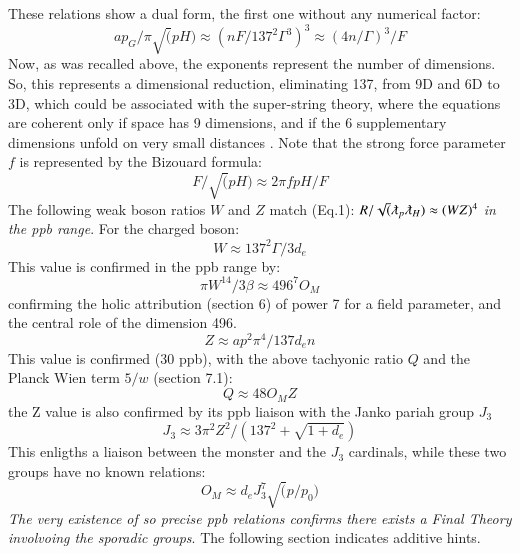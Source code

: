 \documentclass[twoside,draft]{article}
\begin{document}
\begin{sloppypar}
These relations show a dual form, the first one without any numerical factor:
\begin{equation}
ap_{G} / \pi \sqrt(pH) \approx (n F/137^{2} \Gamma^{3} )^{3} \approx (4n/ \Gamma)^{3}/F
\end{equation}
Now, as was recalled above, the exponents represent the number of
dimensions. So, this represents a dimensional reduction, eliminating 137, from 9D and 6D to
3D, which could be associated with the super-string theory, where the equations are coherent only if space
has 9 dimensions, and if the 6 supplementary dimensions unfold on very small distances \cite{Polchinski}.
Note that the strong force parameter $f$ is represented by the Bizouard formula:
\begin{equation}
F/\sqrt(pH) \approx 2\pi fpH/F
\end{equation}
The following weak boson ratios $W$ and $Z$ match (Eq.1):
$R/\sqrt(\lambdabar_{p} \lambdabar_{H} ) \approx (WZ)^{4}$
\textit{in the ppb range}. For the charged boson: 
\begin{equation}
W \approx 137^{2} \Gamma / 3d_{e}
\end{equation}
This value is confirmed in the ppb range by:
\begin{equation}
\pi W^{14}/3 \beta \approx 496^7 O_M
\end{equation}
confirming the holic attribution (section 6) of power 7 for a field parameter, and the central role of the dimension 496.
\begin{equation}
Z \approx ap^{2} \pi^{4} / 137 d_{e} n
\end{equation}
This value is confirmed (30 ppb), with the above tachyonic ratio $Q$ and the Planck Wien term $5/w$ (section 7.1):
\begin{equation}
Q \approx 48 O_M Z
\end{equation}
the Z value is also confirmed by its ppb liaison with the Janko pariah group $J_3$ \cite{Janko}
\begin{equation}
J_3 \approx 3\pi^2 Z^2 / (137^2 + \sqrt{1+d_e})
\end{equation}
This enligths a liaison between the monster and the $J_3$ cardinals, while these two groups have no known relations:
\begin{equation}
O_M \approx d_e J_3^7 \sqrt(p/p_0)
\end{equation}
\textit{The very existence of so precise ppb relations confirms there exists a Final Theory involvoing the sporadic groups}. The following section indicates additive hints.



\end{sloppypar}
\end{document}
